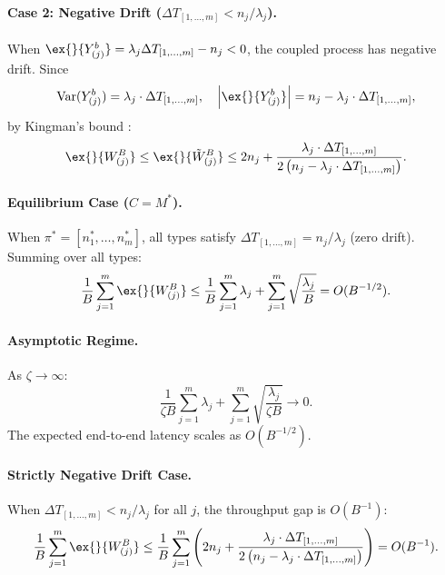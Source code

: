 \paragraph{Case 2: Negative Drift ($\Delta T_{[1,\ldots,m]} < n_j/\lambda_j$).} When $\ex{}{Y^b_{(j)}}= \lambda_j \Delta T_{[1,\ldots,m]} - n_j <0$, the coupled process has negative drift. Since
$$\text{Var}(Y^b_{(j)}) = \lambda_j \cdot \Delta T_{[1,\ldots,m]},\quad
\left| \ex{}{Y^b_{(j)}} \right| = n_j - \lambda_j\cdot \Delta T_{[1,\ldots,m]},$$
by Kingman's bound \citep{kingman1962queues}:
$$\ex{}{W^B_{(j)}}\leq \ex{}{\tilde{W}^B_{(j)}}\leq 2n_j+ \frac{\lambda_j \cdot \Delta T_{[1,\ldots,m]}}{2\left(n_j - \lambda_j\cdot \Delta T_{[1,\ldots,m]}\right)}.$$

\paragraph{Equilibrium Case ($C = M^*$).} When $\pi^* = [n_1^*,\ldots,n_m^*]$, all types satisfy $\Delta T_{[1,\ldots,m]} = n_j/\lambda_j$ (zero drift). Summing over all types:
$$\frac{1}{B}\sum_{j=1}^m \ex{}{W^B_{(j)}}\leq \frac{1}{B}\sum_{j=1}^m \lambda_j +\sum_{j=1}^m \sqrt{\frac{\lambda_j}{B}} = O(B^{-1/2}).$$

\paragraph{Asymptotic Regime.} As $\zeta \to \infty$:
$$\frac{1}{\zeta B}\sum_{j=1}^m \lambda_j +\sum_{j=1}^m \sqrt{\frac{\lambda_j}{\zeta B}} \to 0.$$
The expected end-to-end latency scales as $O(B^{-1/2})$.

\paragraph{Strictly Negative Drift Case.} When $\Delta T_{[1,\ldots,m]} < n_j/\lambda_j$ for all $j$, the throughput gap is $O(B^{-1})$:
$$\frac{1}{B}\sum_{j=1}^m \ex{}{W^B_{(j)}}\leq \frac{1}{B}  \sum_{j=1}^m \left(2n_j+ \frac{\lambda_j \cdot \Delta T_{[1,\ldots,m]}}{2\left(n_j - \lambda_j\cdot \Delta T_{[1,\ldots,m]}\right)}\right) = O(B^{-1}).$$
